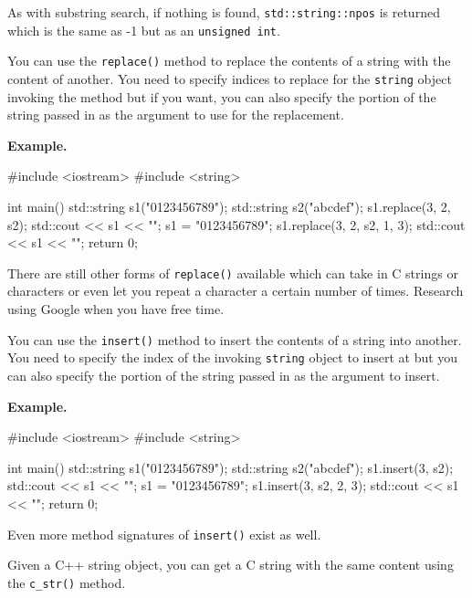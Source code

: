 As with substring search, if nothing is found, \texttt{std::string::npos}
is returned which is the same as -1 but as an \texttt{unsigned int}.

\newpage{}

You can use the \texttt{replace()} method to replace the contents of a
string with the content of another. You need to specify indices to
replace for the \texttt{string} object invoking the method but if you
want, you can also specify the portion of the string passed in as the
argument to use for the replacement.

\textbf{Example.}

\begin{console}
#include <iostream>
#include <string>

int main()
{   
    std::string s1("0123456789");
    std::string s2("abcdef");
    s1.replace(3, 2, s2);
    std::cout << s1 << "\n";
    s1 = "0123456789";
    s1.replace(3, 2, s2, 1, 3);
    std::cout << s1 << "\n";
    return 0;
} 
\end{console}

There are still other forms of \texttt{replace()} available which can take
in C strings or characters or even let you repeat a character a certain
number of times. Research using Google when you have free time.

\newpage{}

You can use the \texttt{insert()} method to insert the contents of a
string into another. You need to specify the index of the invoking
\texttt{string} object to insert at but you can also specify the portion
of the string passed in as the argument to insert.

\textbf{Example.}

\begin{console}
#include <iostream>
#include <string>

int main()
{   
    std::string s1("0123456789");
    std::string s2("abcdef");
    s1.insert(3, s2);
    std::cout << s1 << "\n";
    s1 = "0123456789";
    s1.insert(3, s2, 2, 3);
    std::cout << s1 << "\n";
    return 0;
} 
\end{console}

Even more method signatures of \texttt{insert()} exist as well.

\newpage{}

Given a C++ string object, you can get a C string with the same content
using the \verb!c_str()! method.

